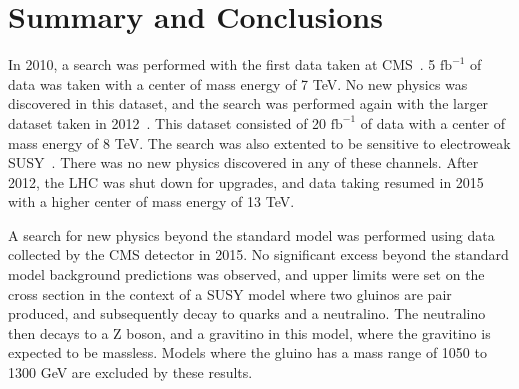 \chapter{Summary and Conclusions}
\label {ch:conclusion}
In 2010, a search was performed with the first data taken at CMS~\cite{2010ZMETpaper}.
5 $\mathrm{fb^{-1}}$ of data was taken with a center of mass energy of 7 TeV.
No new physics was discovered in this dataset, and the search was performed again with the larger dataset taken in 2012~\cite{2012ZMETpaper}.
This dataset consisted of 20 $\mathrm{fb^{-1}}$ of data with a center of mass energy of 8 TeV.
The search was also extented to be sensitive to electroweak SUSY~\cite{2012ewk,2012ewkhiggs}.
There was no new physics discovered in any of these channels.
After 2012, the LHC was shut down for upgrades, and data taking resumed in 2015 with a higher center of mass energy of 13 TeV.

A search for new physics beyond the standard model was performed using data collected by the CMS detector in 2015.
No significant excess beyond the standard model background predictions was observed,
and upper limits were set on the cross section in the context of a SUSY model where two gluinos are pair produced,
and subsequently decay to quarks and a neutralino.
The neutralino then decays to a Z boson, and a gravitino in this model, where the gravitino is expected to be massless.
Models where the gluino has a mass range of 1050 to 1300 GeV are excluded by these results.
